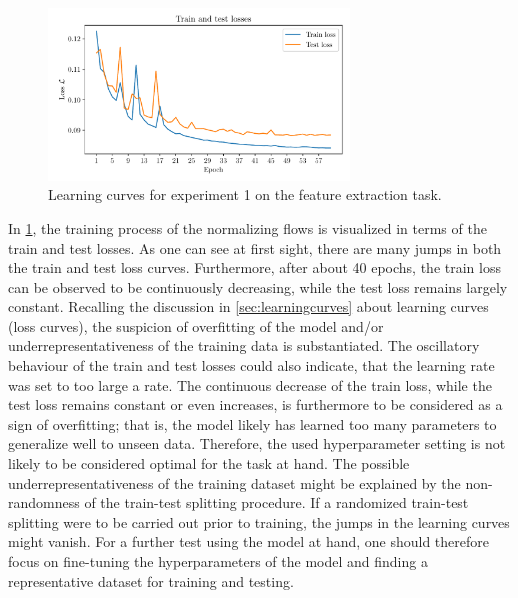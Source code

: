 \documentclass[a4paper,12pt]{report}
\begin{document}
\begin{figure}[h!]
\centering
\includegraphics[width=8cm]{figures/nf-feature-extraction-example-1-loss.pdf}
\caption{Learning curves for experiment 1 on the feature extraction task.}
\label{fig:nf-feature-extraction-example-1-loss}
\end{figure}
In \cref{fig:nf-feature-extraction-example-1-loss}, the training process of the normalizing flows is visualized in terms of the train and test losses. As one can see at first sight, there are many jumps in both the train and test loss curves. Furthermore, after about 40 epochs, the train loss can be observed to be continuously decreasing, while the test loss remains largely constant. Recalling the discussion in \cref{sec:learningcurves} about learning curves (loss curves), the suspicion of overfitting of the model and/or underrepresentativeness of the training data is substantiated. The oscillatory behaviour of the train and test losses could also indicate, that the learning rate was set to too large a rate. The continuous decrease of the train loss, while the test loss remains constant or even increases, is furthermore to be considered as a sign of overfitting; that is, the model likely has learned too many parameters to generalize well to unseen data. Therefore, the used hyperparameter setting is not likely to be considered optimal for the task at hand. The possible underrepresentativeness of the training dataset might be explained by the non-randomness of the train-test splitting procedure. If a randomized train-test splitting were to be carried out prior to training, the jumps in the learning curves might vanish. For a further test using the model at hand, one should therefore focus on fine-tuning the hyperparameters of the model and finding a representative dataset for training and testing.
\end{document}
